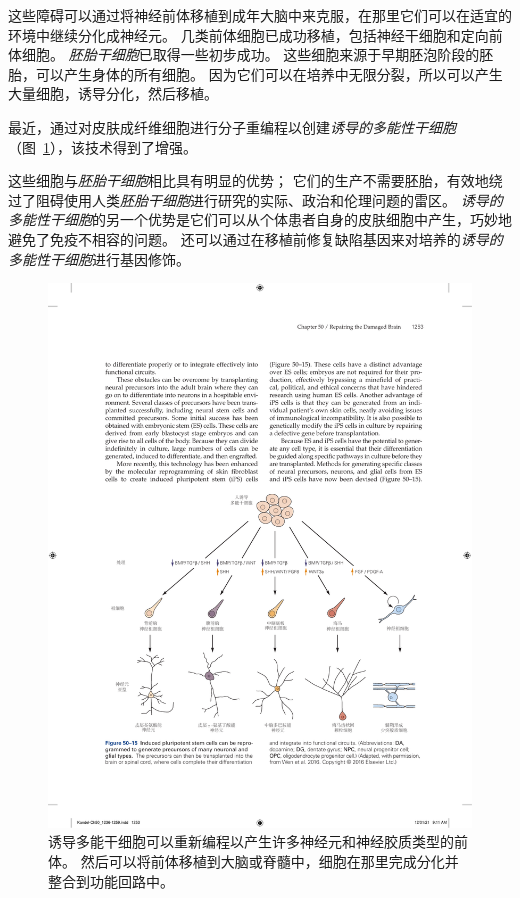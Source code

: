 这些障碍可以通过将神经前体移植到成年大脑中来克服，在那里它们可以在适宜的环境中继续分化成神经元。
几类前体细胞已成功移植，包括神经干细胞和定向前体细胞。
\textit{胚胎干细胞}已取得一些初步成功。
这些细胞来源于早期胚泡阶段的胚胎，可以产生身体的所有细胞。
因为它们可以在培养中无限分裂，所以可以产生大量细胞，诱导分化，然后移植。


最近，通过对皮肤成纤维细胞进行分子重编程以创建\textit{诱导的多能性干细胞}（图~\ref{fig:50_15}），该技术得到了增强。

这些细胞与\textit{胚胎干细胞}相比具有明显的优势；
它们的生产不需要胚胎，有效地绕过了阻碍使用人类\textit{胚胎干细胞}进行研究的实际、政治和伦理问题的雷区。
\textit{诱导的多能性干细胞}的另一个优势是它们可以从个体患者自身的皮肤细胞中产生，巧妙地避免了免疫不相容的问题。
还可以通过在移植前修复缺陷基因来对培养的\textit{诱导的多能性干细胞}进行基因修饰。


\begin{figure}[htbp]
	\centering
	\includegraphics[width=0.95\linewidth]{chap50/fig_50_15}
	\caption{诱导多能干细胞可以重新编程以产生许多神经元和神经胶质类型的前体。
		然后可以将前体移植到大脑或脊髓中，细胞在那里完成分化并整合到功能回路中\cite{wen2016modeling}。}
	\label{fig:50_15}
\end{figure}


